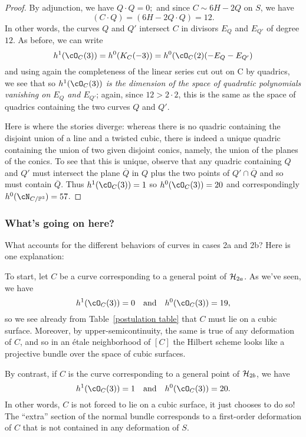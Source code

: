 \begin{proof}
By adjunction, we have $Q \cdot Q = 0; $ and since $C \sim 6H - 2Q$ on $S$, we have
$$
(C\cdot Q) = (6H - 2Q \cdot Q) = 12.
$$
In other words, the curves $Q$ and $Q'$ intersect $C$ in divisors $E_Q$ and $E_{Q'}$ of degree $12$. As before, we can write
$$
h^1(\cO_C(3)) = h^0(K_C(-3)) = h^0(\cO_C(2)(-E_Q-E_{Q'})
$$
and using again the completeness of the linear series cut out on C by quadrics, we see that so \emph{$h^1(\cO_C(3))$ is the dimension of the space of quadratic polynomials vanishing on $E_Q$ and $E_{Q'}$}; again, since $12 > 2\cdot 2$, this is the same as the space of quadrics containing the two curves $Q$ and $Q'$. 

Here is where the stories diverge: whereas there is no quadric containing the disjoint union of a line and a twisted cubic, there is indeed a unique quadric containing the union of two given disjoint conics, namely, the union of the planes of the conics. To see that this is unique, observe that any quadric containing $Q$ and $Q'$ must intersect the plane $\overline Q$ in $Q$ plus the two points of $Q' \cap \overline Q$ and so must contain $\overline Q$.  
Thus $h^1(\cO_C(3))=1$ so  $h^0(\cO_C(3)) = 20$ and correspondingly $h^0(\cN_{C/\PP^3}) = 57$.\end{proof}

\subsubsection{What's going on here?}

What accounts for the different behaviors of curves in cases 2a and 2b? Here is one explanation:

To start, let $C$ be a curve corresponding to a general point of $\cH_{2a}$. As we've seen, we have
$$
h^1(\cO_C(3)) = 0 \quad \text{and} \quad h^0(\cO_C(3)) = 19,
$$
so we see already from Table~\ref{postulation table} that $C$ must lie on a cubic surface. Moreover, by upper-semicontinuity, the same is true of any deformation of $C$, and so in an \'etale neighborhood of $[C]$ the Hilbert scheme looks like a projective bundle over the space of cubic surfaces.

By contrast, if $C$ is the curve corresponding to a general point of $\cH_{2b}$, we have
$$
h^1(\cO_C(3)) = 1 \quad \text{and} \quad h^0(\cO_C(3)) = 20.
$$
In other words, $C$ is not forced to lie on a cubic surface, it just chooses to do so! The ``extra'' section of the normal bundle corresponds to a first-order deformation of $C$ that is not contained in any deformation of $S$. 

